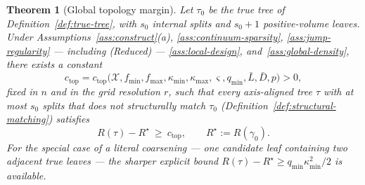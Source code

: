 \documentclass[11pt]{article}
\theoremstyle{plain}
\newtheorem{theorem}{Theorem}[section]
\theoremstyle{definition}
\theoremstyle{remark}
\newcommand{\cX}{\mathcal{X}}
\begin{document}
\begin{theorem}[Global topology margin]\label{thm:gtm-b}
Let \(\tau_0\) be the true tree of Definition~\ref{def:true-tree}, with
\(s_0\) internal splits and \(s_0+1\) positive-volume leaves. Under
Assumptions~\ref{ass:construct}(a), \ref{ass:continuum-sparsity},
\ref{ass:jump-regularity} --- including (Reduced) --- \ref{ass:local-design},
and~\ref{ass:global-density}, there exists a constant
\[
  c_{\mathrm{top}}
  =
  c_{\mathrm{top}}\bigl(\cX,f_{\min},f_{\max},\kappa_{\min},\kappa_{\max},
  \varsigma,q_{\min},\bar L,\bar D,p\bigr)>0,
\]
fixed in \(n\) and in the grid resolution \(r\), such that every axis-aligned
tree \(\tau\) with at most \(s_0\) splits that does \emph{not} structurally
match \(\tau_0\) (Definition~\ref{def:structural-matching}) satisfies
\[
  R(\tau)-R^\star\ \ge\ c_{\mathrm{top}},
  \qquad
  R^\star:=R(\gamma_0).
\]
For the special case of a literal coarsening --- one candidate leaf containing
two adjacent true leaves --- the sharper explicit bound
\(R(\tau)-R^\star\ge q_{\min}\kappa_{\min}^2/2\) is available.
\end{theorem}
\end{document}
